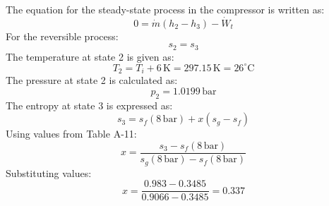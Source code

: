The equation for the steady-state process in the compressor is written as:  
\[
0 = \dot{m}(h_2 - h_3) - \dot{W}_t
\]  
For the reversible process:  
\[
s_2 = s_3
\]  
The temperature at state 2 is given as:  
\[
T_2 = T_i + 6 \, \text{K} = 297.15 \, \text{K} = 26^\circ\text{C}
\]  
The pressure at state 2 is calculated as:  
\[
p_2 = 1.0199 \, \text{bar}
\]  
The entropy at state 3 is expressed as:  
\[
s_3 = s_f(8 \, \text{bar}) + x(s_g - s_f)
\]  
Using values from Table A-11:  
\[
x = \frac{s_3 - s_f(8 \, \text{bar})}{s_g(8 \, \text{bar}) - s_f(8 \, \text{bar})}
\]  
Substituting values:  
\[
x = \frac{0.983 - 0.3485}{0.9066 - 0.3485} = 0.337
\]